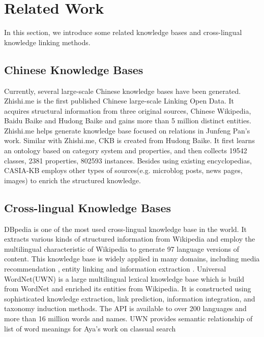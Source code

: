 \documentclass[runningheads,a4paper]{llncs}
\begin{document}

\section{Related Work}
\label{sec:work}
In this section, we introduce some related knowledge bases and cross-lingual knowledge linking methods.
\subsection{Chinese Knowledge Bases}
Currently, several large-scale Chinese knowledge bases have been generated. Zhishi.me\cite{niu2011zhishi,wang2014publishing} is the first published Chinese large-scale Linking Open Data. It acquires structural information from three original sources, Chinese Wikipedia, Baidu Baike and Hudong Baike and gains more than 5 million distinct entities. Zhishi.me helps generate knowledge base focused on relations in Junfeng Pan’s work\cite{pan2012building}.
Similar with Zhishi.me, CKB\cite{wang2012building} is created from Hudong Baike. It first learns an ontology based on category system and properties, and then collects 19542 classes, 2381 properties, 802593 instances. Besides using existing encyclopedias, CASIA-KB employs other types of sources(e.g. microblog posts, news pages, images) to enrich the structured knowledge.
\subsection{Cross-lingual Knowledge Bases}
DBpedia \cite{auer2007dbpedia,mendes2012dbpedia} is one of the most used cross-lingual knowledge base in the world. It extracts various kinds of structured information from Wikipedia and employ the multilingual characteristic of Wikipedia to generate 97 language versions of content. This knowledge base is widely applied in many domains, including media recommendation \cite{fernandez2011generic,kaminskas2012knowledge}, entity linking\cite{mendes2011evaluating} and information extraction \cite{dutta2013integrating}. Universal WordNet(UWN)\cite{de2012uwn} is a large multilingual lexical knowledge base which is build from WordNet and enriched its entities from Wikipedia. It is constructed using sophisticated knowledge extraction, link prediction, information integration, and taxonomy induction methods. The API is available to over 200 languages and more than 16 million words and names. UWN provides semantic relationship of list of word meanings for Aya's work on classual search \cite{al2015classual}
\end{document}
